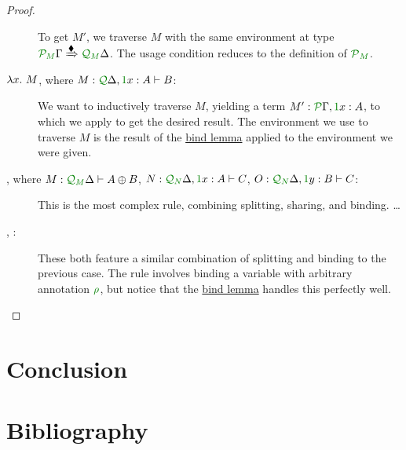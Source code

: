 \documentclass[submission,copyright,creativecommons]{eptcs}
\begin{document}
\begin{proof}
\begin{description}
      To get $M'$, we traverse $M$ with the same environment at type
      $\ctx{\Gamma}{P_{\mathnormal M}}
      \subst{\kitrel} \ctx{\Delta}{Q_{\mathnormal M}}$.
      The usage condition reduces to the definition of
      $\resctx P_{\rescomment M}$.
    \item[\TirName{$\fun{}{}$-I} $\lambda x.~M$, where
      $M : \ctx{\Delta}{Q}, \ctxvar{x}{A}{1} \vdash B$:]
      We want to inductively traverse $M$, yielding a term
      $M' : \ctx{\Gamma}{P}, \ctxvar{x}{A}{1}$, to which we apply
       to get the desired result.
      The environment we use to traverse $M$ is the result of the
      \hyperref[lem:bind]{bind lemma} applied to the environment we were given.
    \item[\TirName{$\sumT{}{}$-E}, where
      $M : \ctx{\Delta}{Q_{\mathnormal M}} \vdash \sumT{A}{B}$,
      $N : \ctx{\Delta}{Q_{\mathnormal N}}, \ctxvar{x}{A}{1} \vdash C$,
      $O : \ctx{\Delta}{Q_{\mathnormal N}}, \ctxvar{y}{B}{1} \vdash C$:]
      This is the most complex rule, combining splitting, sharing, and binding.
      \ldots
    \item[\TirName{$\tensor{}{}$-E}, \TirName{$\excl{\rho}{}$-E}:]
      These both feature a similar combination of splitting and binding to the
      previous case.
      The  rule involves binding a variable with
      arbitrary annotation $\rescomment\rho$, but notice that the
      \hyperref[lem:bind]{bind lemma} handles this perfectly well.
  \end{description}
\end{proof}

\section{Conclusion}

\section{Bibliography}



\end{document}
